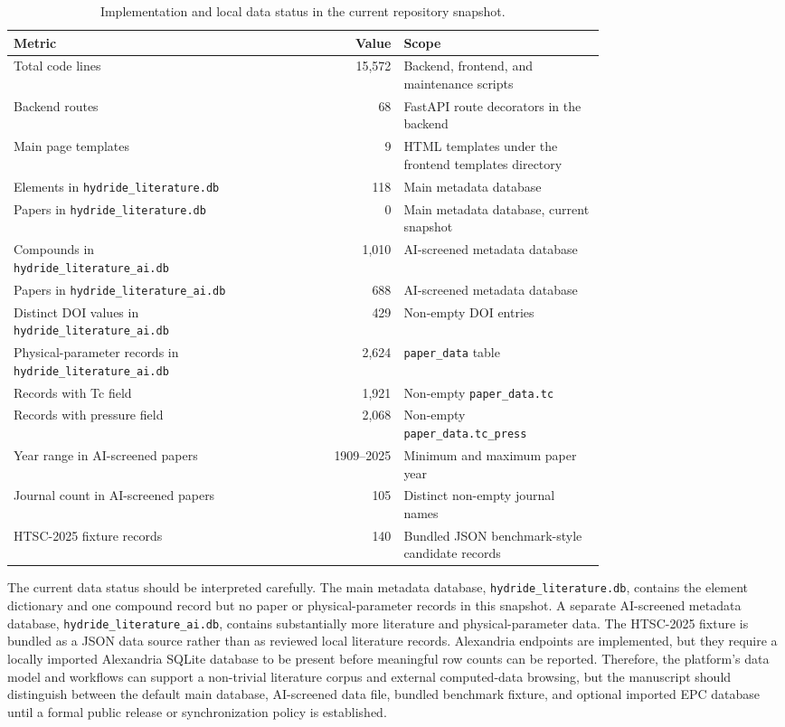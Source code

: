 \documentclass[11pt,a4paper]{article}
\begin{document}
\begin{table}[t]
\centering
\caption{Implementation and local data status in the current repository snapshot.}
\label{tab:status}
\begin{tabular}{>{\raggedright\arraybackslash}p{0.42\linewidth} r >{\raggedright\arraybackslash}p{0.34\linewidth}}
\toprule
Metric & Value & Scope \\
\midrule
Total code lines & 15,572 & Backend, frontend, and maintenance scripts \\
Backend routes & 68 & FastAPI route decorators in the backend \\
Main page templates & 9 & HTML templates under the frontend templates directory \\
Elements in \texttt{hydride\_literature.db} & 118 & Main metadata database \\
Papers in \texttt{hydride\_literature.db} & 0 & Main metadata database, current snapshot \\
Compounds in \texttt{hydride\_literature\_ai.db} & 1,010 & AI-screened metadata database \\
Papers in \texttt{hydride\_literature\_ai.db} & 688 & AI-screened metadata database \\
Distinct DOI values in \texttt{hydride\_literature\_ai.db} & 429 & Non-empty DOI entries \\
Physical-parameter records in \texttt{hydride\_literature\_ai.db} & 2,624 & \texttt{paper\_data} table \\
Records with Tc field & 1,921 & Non-empty \texttt{paper\_data.tc} \\
Records with pressure field & 2,068 & Non-empty \texttt{paper\_data.tc\_press} \\
Year range in AI-screened papers & 1909--2025 & Minimum and maximum paper year \\
Journal count in AI-screened papers & 105 & Distinct non-empty journal names \\
HTSC-2025 fixture records & 140 & Bundled JSON benchmark-style candidate records \\
\bottomrule
\end{tabular}
\end{table}

The current data status should be interpreted carefully. The main metadata database, \texttt{hydride\_literature.db}, contains the element dictionary and one compound record but no paper or physical-parameter records in this snapshot. A separate AI-screened metadata database, \texttt{hydride\_literature\_ai.db}, contains substantially more literature and physical-parameter data. The HTSC-2025 fixture is bundled as a JSON data source rather than as reviewed local literature records. Alexandria endpoints are implemented, but they require a locally imported Alexandria SQLite database to be present before meaningful row counts can be reported. Therefore, the platform's data model and workflows can support a non-trivial literature corpus and external computed-data browsing, but the manuscript should distinguish between the default main database, AI-screened data file, bundled benchmark fixture, and optional imported EPC database until a formal public release or synchronization policy is established.
\end{document}
